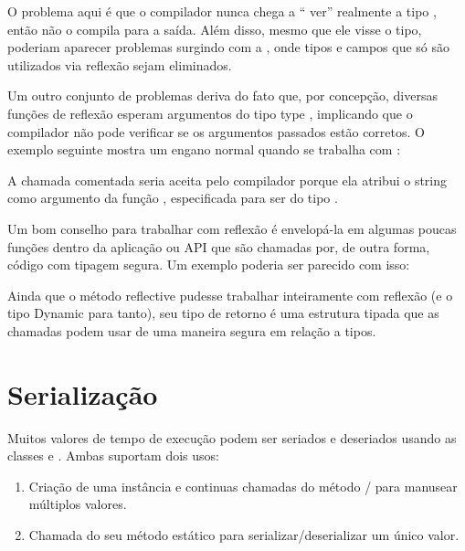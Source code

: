 {\begin{description}

O problema aqui é que o compilador nunca chega a `` ver'' realmente a tipo  , então não o compila para a saída. Além disso, mesmo que ele visse o tipo, poderiam aparecer problemas surgindo com a , onde tipos e campos que só são utilizados via reflexão sejam eliminados.

Um outro conjunto de problemas deriva do fato que, por concepção, diversas funções de reflexão esperam argumentos do tipo type , implicando que o compilador não pode verificar se os argumentos passados estão corretos. O exemplo seguinte mostra um engano normal quando se trabalha com :


A chamada comentada seria aceita pelo compilador porque ela atribui o string  como argumento da função , especificada para ser do tipo .

Um bom conselho para trabalhar com reflexão é envelopá-la em algumas poucas funções dentro da aplicação ou API que são chamadas por, de outra forma, código com tipagem segura. Um exemplo poderia ser parecido com isso:


Ainda que o método reflective pudesse trabalhar inteiramente com reflexão (e o tipo Dynamic para tanto), seu tipo de retorno é uma estrutura tipada que as chamadas podem usar de uma maneira segura em relação a tipos. 

\section{Serialização}
\label{std-serialization}

Muitos valores de tempo de execução podem ser seriados e deseriados usando as classes  e . Ambas suportam dois usos:

\begin{enumerate}
    \item Criação de uma instância e continuas chamadas do método / para manusear múltiplos valores.
    \item Chamada do seu método estático  para serializar/deserializar um único valor.
\end{enumerate}


\end{description}}
